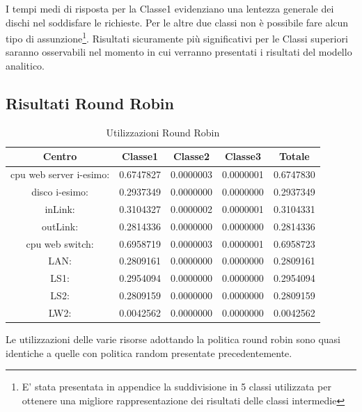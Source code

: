 I tempi medi di risposta per la Classe1 evidenziano una lentezza generale dei dischi nel soddisfare le richieste. Per le altre due classi non è possibile fare alcun tipo di assunzione\footnote{E' stata presentata in appendice la suddivisione in 5 classi utilizzata per ottenere una migliore rappresentazione dei risultati delle classi intermedie}. Risultati sicuramente più significativi per le Classi superiori saranno osservabili nel momento in cui verranno presentati i risultati del modello analitico.
\subsection{Risultati Round Robin}
\begin{table}[H]
\begin{center}
\begin{tabular}{|c|c|c|c|c|}
\hline
Centro &Classe1 &Classe2 &Classe3 &Totale\\
\hline
\hline
 cpu web server i-esimo: 	&0.6747827	&0.0000003	&0.0000001	&0.6747830\\
\hline
 disco i-esimo: 	&0.2937349	&0.0000000	&0.0000000	&0.2937349\\
\hline
 inLink: 	&0.3104327	&0.0000002	&0.0000001	&0.3104331\\
\hline
 outLink: 	&0.2814336	&0.0000000	&0.0000000	&0.2814336\\
\hline
 cpu web switch: 	&0.6958719	&0.0000003	&0.0000001	&0.6958723\\
\hline
 LAN: 	&0.2809161	&0.0000000	&0.0000000	&0.2809161\\
\hline
 LS1: 	&0.2954094	&0.0000000	&0.0000000	&0.2954094\\
\hline
 LS2:	&0.2809159	&0.0000000	&0.0000000	&0.2809159\\
\hline
 LW2: 	&0.0042562	&0.0000000	&0.0000000	&0.0042562\\
\hline
\end{tabular}
\end{center}
\caption{Utilizzazioni Round Robin}
\label{utilizzazioni}
\end{table}
Le utilizzazioni delle varie risorse adottando la politica round robin sono quasi identiche a quelle con politica random presentate precedentemente.
